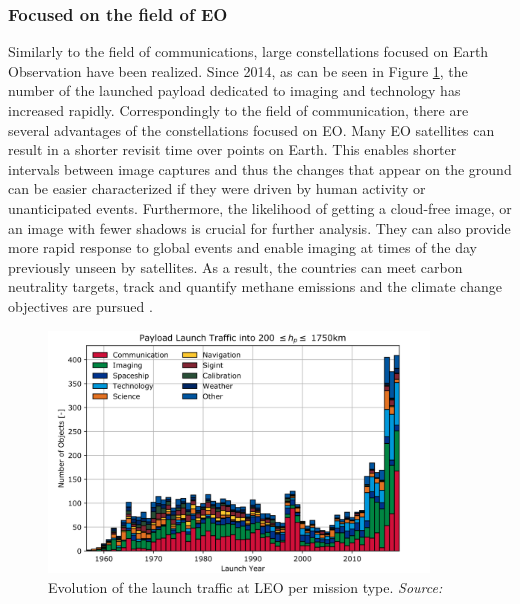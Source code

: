 \subsubsection{Focused on the field of EO}
\bigskip
Similarly to the field of communications, large constellations focused on Earth Observation have been realized. Since 2014, as can be seen in Figure \ref{launch_traffic_type_LEO}, the number of the launched payload dedicated to imaging and technology has increased rapidly. Correspondingly to the field of communication, there are several advantages of the constellations focused on EO. Many EO satellites can result in a shorter revisit time over points on Earth. This enables shorter intervals between image captures and thus the changes that appear on the ground can be easier characterized if they were driven by human activity or unanticipated events. Furthermore, the likelihood of getting a cloud-free image, or an image with fewer shadows is crucial for further analysis. They can also provide more rapid response to global events and enable imaging at times of the day previously unseen by satellites. As a result, the countries can meet carbon neutrality targets, track and quantify methane emissions and the climate change objectives are pursued \cite{LE_Esteve}. %

\begin{figure}
\centering
\includegraphics[width=0.9\textwidth]{Images/launch_traffic_type_LEO.png}\caption{Evolution of the launch traffic at LEO per mission type. \textit{Source: \cite{ESA 2020}}}
\label{launch_traffic_type_LEO} 
\end{figure} 

